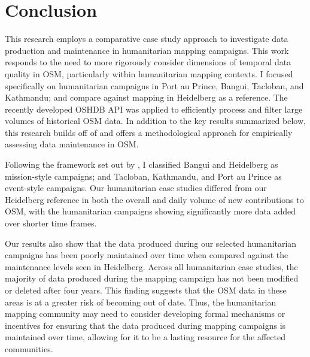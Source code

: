 \chapter{Conclusion}
\label{chapterlabel7}

This research employs a comparative case study approach to investigate data production and maintenance in humanitarian mapping campaigns. This work responds to the need to more rigorously consider dimensions of temporal data quality in OSM, particularly within humanitarian mapping contexts. I focused specifically on humanitarian campaigns in Port au Prince, Bangui, Tacloban, and Kathmandu; and compare against mapping in Heidelberg as a reference. The recently developed OSHDB API was applied to efficiently process and filter large volumes of historical OSM data. In addition to the key results summarized below, this research builds off of \textcite{quattrone_work_2017} and offers a methodological approach for empirically assessing data maintenance in OSM.  

Following the framework set out by \textcite{dittus_mass_2017}, I classified Bangui and Heidelberg as mission-style campaigns; and Tacloban, Kathmandu, and Port au Prince as event-style campaigns. Our humanitarian case studies differed from our Heidelberg reference in both the overall and daily volume of new contributions to OSM, with the humanitarian campaigns showing significantly more data added over shorter time frames. 

Our results also show that the data produced during our selected humanitarian campaigns has been poorly maintained over time when compared against the maintenance levels seen in Heidelberg. Across all humanitarian case studies, the majority of data produced during the mapping campaign has not been modified or deleted after four years. This finding suggests that the OSM data in these areas is at a greater risk of becoming out of date. Thus, the humanitarian mapping community may need to consider developing formal mechanisms or incentives for ensuring that the data produced during mapping campaigns is maintained over time, allowing for it to be a lasting resource for the affected communities. 


